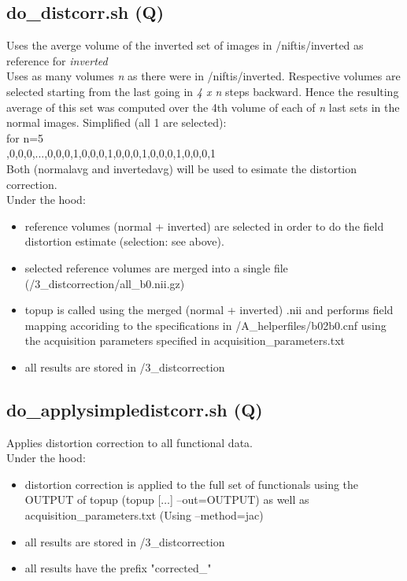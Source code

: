\documentclass[12pt,a4paper]{scrartcl}
\begin{document}
\subsection{do\_distcorr.sh (Q)}
\label{sec:distcorr}
Uses the averge volume of the inverted set of images in /niftis/inverted as reference for \textit{inverted}\\

\noindent Uses as many volumes \textit{n} as there were in /niftis/inverted. Respective volumes are selected starting from the last going in \textit{4 x n} steps backward. Hence the resulting average of this set was computed over the 4th volume of each of \textit{n} last sets in the normal images. Simplified (all 1 are selected):\\

\noindent for n=5\\

,0,0,0,...,0,0,0,1,0,0,0,1,0,0,0,1,0,0,0,1,0,0,0,1\\

\noindent Both (normalavg and invertedavg) will be used to esimate the distortion correction.\\

\noindent Under the hood:
\begin{itemize}
\item reference volumes (normal + inverted) are selected in order to do the field distortion estimate (selection: see above).
\item selected reference volumes are merged into a single file (/3\_distcorrection/all\_b0.nii.gz)
\item topup is called using the merged (normal + inverted) .nii and performs field mapping accoriding to the specifications in /A\_helperfiles/b02b0.cnf using the acquisition parameters specified in acquisition\_parameters.txt
\item all results are stored in /3\_distcorrection
\end{itemize}

\subsection{do\_applysimpledistcorr.sh (Q)}
\label{sec:applydistcorr}
Applies distortion correction to all functional data.\\

\noindent Under the hood:
\begin{itemize}
\item distortion correction is applied to the full set of functionals using the OUTPUT of topup (topup [$\ldots$] --out=OUTPUT) as well as acquisition\_parameters.txt (Using --method=jac)
\item all results are stored in /3\_distcorrection
\item all results have the prefix "corrected\_"
\end{itemize}
\end{document}
